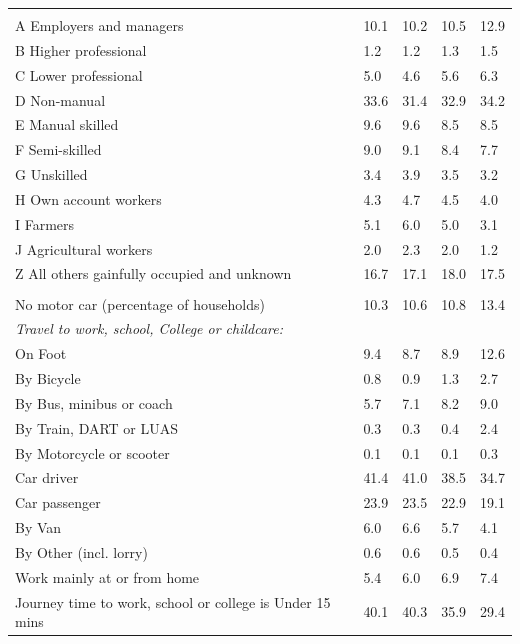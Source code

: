 \documentclass{article}
\begin{document}
\begin{table}[h]
\begin{tabular}{KTTTT}
\hline
    \\ 
    \hline
A Employers and managers & 10.1& 10.2& 10.5& 12.9\\
B Higher professional & 1.2& 1.2& 1.3& 1.5\\
C Lower professional & 5.0& 4.6& 5.6& 6.3\\
D Non-manual & 33.6& 31.4& 32.9& 34.2\\
E Manual skilled & 9.6& 9.6& 8.5& 8.5\\
F Semi-skilled & 9.0& 9.1& 8.4& 7.7\\
G Unskilled & 3.4& 3.9& 3.5& 3.2\\
H Own account workers & 4.3& 4.7& 4.5& 4.0\\
I Farmers & 5.1& 6.0& 5.0& 3.1\\
J Agricultural workers & 2.0& 2.3& 2.0& 1.2\\
Z All others gainfully occupied and unknown & 16.7& 17.1& 18.0& 17.5\\
\hline
{}\hline
    \\ 
    \hline
No motor car (percentage of households) & 10.3& 10.6& 10.8& 
13.4\\
    \hline 
\emph{Travel to work, school, College or childcare:} & & & \\
\quad On Foot &  9.4&  8.7&  8.9& 12.6\\ 
\quad By Bicycle & 0.8& 0.9& 1.3& 2.7\\ 
\quad By Bus, minibus or coach & 5.7& 7.1& 8.2& 9.0\\
\quad By Train, DART or LUAS & 0.3& 0.3& 0.4& 2.4\\
\quad By Motorcycle or scooter & 0.1& 0.1& 0.1& 0.3\\
\quad Car driver & 41.4 & 41.0& 38.5& 34.7\\
\quad Car passenger & 23.9& 23.5& 22.9& 19.1\\
\quad By Van & 6.0& 6.6& 5.7& 4.1\\
\quad By Other (incl. lorry) & 0.6& 0.6& 0.5& 0.4\\
    \hline
Work mainly at or from home & 5.4& 6.0& 6.9& 7.4\\
Journey time to work, school or college is Under 15 mins & 40.1& 40.3& 35.9& 29.4\\

\end{tabular}
\end{table}
\end{document}
